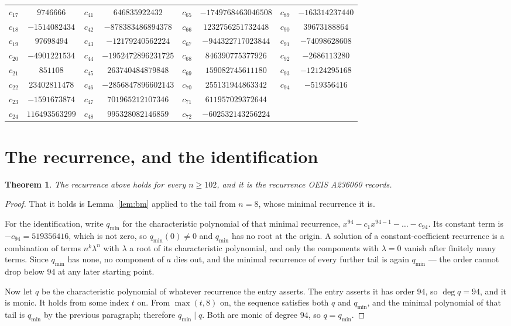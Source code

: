 \documentclass[11pt,a4paper]{article}
\theoremstyle{plain}
\newtheorem{theorem}{Theorem}
\theoremstyle{definition}
\begin{document}
\begin{center}
\begin{tabular}{cccccccc}
$c_{17}$ & $9746666$ & $c_{41}$ & $646835922432$ & $c_{65}$ & $-1749768463046508$ & $c_{89}$ & $-163314237440$ \\
$c_{18}$ & $-1514082434$ & $c_{42}$ & $-878383486894378$ & $c_{66}$ & $1232756251732448$ & $c_{90}$ & $39673188864$ \\
$c_{19}$ & $97698494$ & $c_{43}$ & $-12179240562224$ & $c_{67}$ & $-944322717023844$ & $c_{91}$ & $-74098628608$ \\
$c_{20}$ & $-4901221534$ & $c_{44}$ & $-1952472896231725$ & $c_{68}$ & $846390775377926$ & $c_{92}$ & $-2686113280$ \\
$c_{21}$ & $851108$ & $c_{45}$ & $263740484879848$ & $c_{69}$ & $159082745611180$ & $c_{93}$ & $-12124295168$ \\
$c_{22}$ & $23402811478$ & $c_{46}$ & $-2856847896602143$ & $c_{70}$ & $255131944863342$ & $c_{94}$ & $-519356416$ \\
$c_{23}$ & $-1591673874$ & $c_{47}$ & $701965212107346$ & $c_{71}$ & $611957029372644$ &  &  \\
$c_{24}$ & $116493563299$ & $c_{48}$ & $995328082146859$ & $c_{72}$ & $-602532143256224$ &  &  \\
\end{tabular}
\end{center}

\section{The recurrence, and the identification}

\begin{theorem}
The recurrence above holds for every $n\ge102$, and it is the recurrence OEIS A236060 records.
\end{theorem}

\begin{proof}
That it holds is Lemma~\ref{lem:bm} applied to the tail from $n=8$, whose minimal
recurrence it is.

For the identification, write $q_{\min}$ for the characteristic polynomial of that minimal
recurrence, $x^{94}-c_1x^{94-1}-\dots-c_{94}$. Its constant term is
$-c_{94}=519356416$, which is not zero, so $q_{\min}(0)\neq0$ and $q_{\min}$ has no
root at the origin. A solution of a constant-coefficient recurrence is a combination of terms
$n^{k}\lambda^{n}$ with $\lambda$ a root of its characteristic polynomial, and only the
components with $\lambda=0$ vanish after finitely many terms. Since $q_{\min}$ has none, no
component of $a$ dies out, and the minimal recurrence of every further tail is again
$q_{\min}$ --- the order cannot drop below $94$ at any later starting point.

Now let $q$ be the characteristic polynomial of whatever recurrence the entry asserts. The
entry asserts it has order $94$, so $\deg q=94$, and it is monic. It holds from some
index $t$ on. From $\max(t,8)$ on, the sequence satisfies both $q$ and $q_{\min}$, and
the minimal polynomial of that tail is $q_{\min}$ by the previous paragraph; therefore
$q_{\min}\mid q$. Both are monic of degree $94$, so $q=q_{\min}$.
\end{proof}
\end{document}
